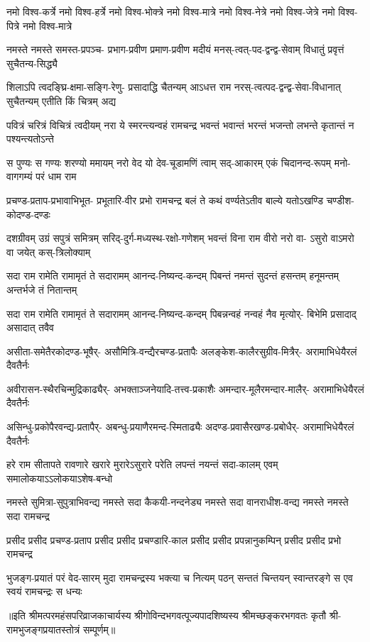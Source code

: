 \fourlineindentedshloka
{नमो विश्व-कर्त्रे नमो विश्व-हर्त्रे}
{नमो विश्व-भोक्त्रे नमो विश्व-मात्रे}
{नमो विश्व-नेत्रे नमो विश्व-जेत्रे}
{नमो विश्व-पित्रे नमो विश्व-मात्रे}%

\fourlineindentedshloka
{नमस्ते नमस्ते समस्त-प्रपञ्च-}
{प्रभाग-प्रवीण प्रमाण-प्रवीण}
{मदीयं मनस्-त्वत्-पद-द्वन्द्व-सेवाम्}
{विधातुं प्रवृत्तं सुचैतन्य-सिद्ध्यै}%

\fourlineindentedshloka
{शिलाऽपि त्वदङ्घ्रि-क्षमा-सङ्गि-रेणु-}
{प्रसादाद्धि चैतन्यम् आऽधत्त राम}
{नरस्-त्वत्पद-द्वन्द्व-सेवा-विधानात्}
{सुचैतन्यम् एतीति किं चित्रम् अद्य}%

\fourlineindentedshloka
{पवित्रं चरित्रं विचित्रं त्वदीयम्}
{नरा ये स्मरन्त्यन्वहं रामचन्द्र}
{भवन्तं भवान्तं भरन्तं भजन्तो}
{लभन्ते कृतान्तं न पश्यन्त्यतोऽन्ते}%

\fourlineindentedshloka
{स पुण्यः स गण्यः शरण्यो ममायम्}
{नरो वेद यो देव-चूडामणिं त्वाम्}
{सद्-आकारम् एकं चिदानन्द-रूपम्}
{मनो-वागगम्यं परं धाम राम}%

\fourlineindentedshloka
{प्रचण्ड-प्रताप-प्रभावाभिभूत-}
{प्रभूतारि-वीर प्रभो रामचन्द्र}
{बलं ते कथं वर्ण्यतेऽतीव बाल्ये}
{यतोऽखण्डि चण्डीश-कोदण्ड-दण्डः}%

\fourlineindentedshloka
{दशग्रीवम् उग्रं सपुत्रं समित्रम्}
{सरिद्-दुर्ग-मध्यस्थ-रक्षो-गणेशम्}
{भवन्तं विना राम वीरो नरो वा-}
{ऽसुरो वाऽमरो वा जयेत् कस्-त्रिलोक्याम्}%

\fourlineindentedshloka
{सदा राम रामेति रामामृतं ते}
{सदारामम् आनन्द-निष्यन्द-कन्दम्}
{पिबन्तं नमन्तं सुदन्तं हसन्तम्}
{हनूमन्तम् अन्तर्भजे तं नितान्तम्}%

\fourlineindentedshloka
{सदा राम रामेति रामामृतं ते}
{सदारामम् आनन्द-निष्यन्द-कन्दम्}
{पिबन्नन्वहं नन्वहं नैव मृत्योर्-}
{बिभेमि प्रसादाद् असादात् तवैव}%

\fourlineindentedshloka
{असीता-समेतैरकोदण्ड-भूषैर्-}
{असौमित्रि-वन्द्यैरचण्ड-प्रतापैः}
{अलङ्केश-कालैरसुग्रीव-मित्रैर्-}
{अरामाभिधेयैरलं दैवतैर्नः}%

\fourlineindentedshloka
{अवीरासन-स्थैरचिन्मुद्रिकाढ्यैर्-}
{अभक्ताञ्जनेयादि-तत्त्व-प्रकाशैः}
{अमन्दार-मूलैरमन्दार-मालैर्-}
{अरामाभिधेयैरलं दैवतैर्नः}%

\fourlineindentedshloka
{असिन्धु-प्रकोपैरवन्द्य-प्रतापैर्-}
{अबन्धु-प्रयाणैरमन्द-स्मिताढ्यैः}
{अदण्ड-प्रवासैरखण्ड-प्रबोधैर्-}
{अरामाभिधेयैरलं दैवतैर्नः}%

\fourlineindentedshloka
{हरे राम सीतापते रावणारे}
{खरारे मुरारेऽसुरारे परेति}
{लपन्तं नयन्तं सदा-कालम् एवम्}
{समालोकयाऽऽलोकयाऽशेष-बन्धो}%

\fourlineindentedshloka
{नमस्ते सुमित्रा-सुपुत्राभिवन्द्य}
{नमस्ते सदा कैकयी-नन्दनेड्य}
{नमस्ते सदा वानराधीश-वन्द्य}
{नमस्ते नमस्ते सदा रामचन्द्र}%

\fourlineindentedshloka
{प्रसीद प्रसीद प्रचण्ड-प्रताप}
{प्रसीद प्रसीद प्रचण्डारि-काल}
{प्रसीद प्रसीद प्रपन्नानुकम्पिन्}
{प्रसीद प्रसीद प्रभो रामचन्द्र}%

\fourlineindentedshloka
{भुजङ्ग-प्रयातं परं वेद-सारम्}
{मुदा रामचन्द्रस्य भक्त्या च नित्यम्}
{पठन् सन्ततं चिन्तयन् स्वान्तरङ्गे}
{स एव स्वयं रामचन्द्रः स धन्यः}%

{॥इति श्रीमत्परमहंसपरिव्राजकाचार्यस्य श्रीगोविन्दभगवत्पूज्यपादशिष्यस्य 
श्रीमच्छङ्करभगवतः कृतौ श्री-रामभुजङ्गप्रयातस्तोत्रं सम्पूर्णम्॥}

\closesection
